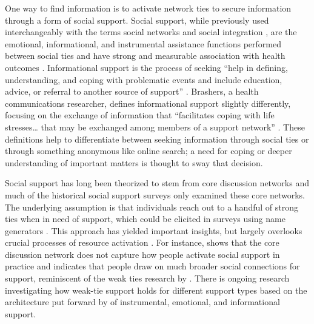 One way to find information is to activate network ties to secure information
through a form of social support. Social support, while previously used
interchangeably with the terms social networks and social integration
\citep{houseStructuresProcessesSocial1988}, are the emotional, informational,
and instrumental assistance functions performed between social ties and have
strong and measurable association with health outcomes
\citep{houseMeasuresConceptsSocial1985, thoitsMechanismsLinkingSocial2011}.
Informational support is the process of seeking ``help in defining,
understanding, and coping with problematic events and include education, advice,
or referral to another source of support'' \citep[][p. 640]{winemiller_etal93}.
Brashers, a health communications researcher, defines informational support
slightly differently, focusing on the exchange of information that ``facilitates
coping with life stresses… that may be exchanged among members of a support
network'' \citet[][p. 260]{brashersInformationSeekingAvoiding2002}. These
definitions help to differentiate between seeking information through social
ties or through something anonymous like online search; a need for coping or
deeper understanding of important matters is thought to sway that decision.

Social support has long been theorized to stem from core discussion networks and
much of the historical social support surveys only examined these core networks.
The underlying assumption is that individuals reach out to a handful of strong
ties when in need of support, which could be elicited in surveys using name
generators \citep{marsdenCoreDiscussionNetworks1987}. This approach has yielded
important insights, but largely overlooks crucial processes of resource
activation \citep{hurlbertCoreNetworksTie2000, perrySocialNetworkActivation2015,
smithDonPutMy2005}. For instance, \citet{smallSomeoneTalk2017} shows that
the core discussion network does not capture how people activate social support
in practice and indicates that people draw on much broader social connections
for support, reminiscent of the weak ties research by \citet{granovetterStrengthWeakTies1973}.
There is ongoing research investigating
how weak-tie support holds for different support types based on the architecture
put forward by \citet{houseStructuresProcessesSocial1988} of instrumental,
emotional, and informational support.

